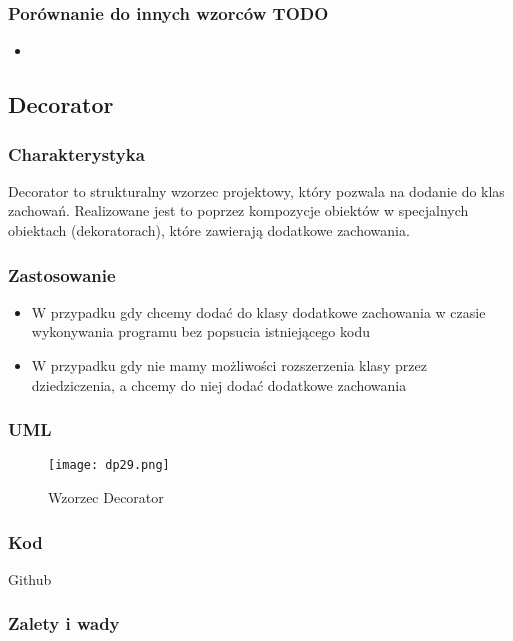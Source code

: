 \documentclass[a4paper,15pt]{article}
\begin{document}
\subsubsection{Porównanie do innych wzorców TODO}
\begin{itemize}
\item
\end{itemize}

\newpage
\subsection{Decorator}

\subsubsection{Charakterystyka}
Decorator to strukturalny wzorzec projektowy, który pozwala na dodanie do klas zachowań. Realizowane jest to poprzez kompozycje obiektów w specjalnych obiektach (dekoratorach), które zawierają dodatkowe zachowania.

\subsubsection{Zastosowanie}
\begin{itemize}
\item W przypadku gdy chcemy dodać do klasy dodatkowe zachowania w czasie wykonywania programu bez popsucia istniejącego kodu
\item W przypadku gdy nie mamy możliwości rozszerzenia klasy przez dziedziczenia, a chcemy do niej dodać dodatkowe zachowania
\end{itemize}

\subsubsection{UML}

\begin{figure}[H]
\centering
  \texttt{[image: dp29.png]}
  \caption{Wzorzec Decorator}
\end{figure}

\subsubsection{Kod}
Github

\subsubsection{Zalety i wady}
\end{document}
